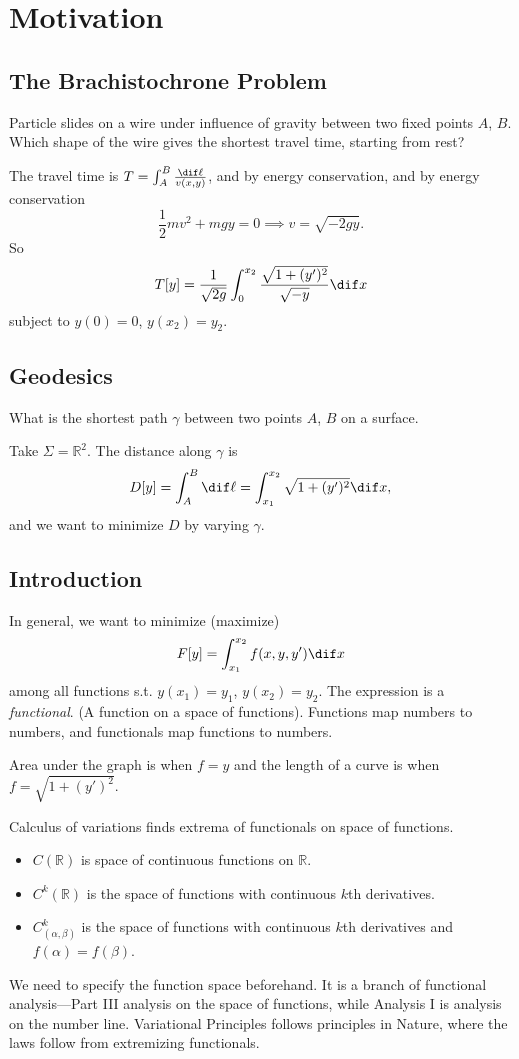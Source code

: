 \section*{Motivation}
\subsection{The Brachistochrone Problem}
\begin{problem}
Particle slides on a wire under influence of gravity between two fixed points \(A\), \(B\). Which shape of the wire gives the shortest travel time, starting from rest?
\end{problem}

The travel time is \(T = \int_{A}^{B} \frac{\dif \ell}{v(x, y)}\), and by energy conservation, and by energy conservation
\[
    \frac{1}{2} mv^2 + mg y = 0 \implies v = \sqrt{-2gy}.
\]
So
\[
    T[y] = \frac{1}{\sqrt{2g}}\int_{0}^{x_2} \frac{\sqrt{1 + (y')^2}}{\sqrt{-y}} \dif x
\]
subject to \(y(0) = 0\), \(y(x_2) = y_2\).
\subsection{Geodesics}
\begin{problem}
    What is the shortest path \(\gamma\) between two points \(A\), \(B\) on a surface.
\end{problem}
Take \(\Sigma = \mathbb{R}^2\). The distance along \(\gamma\) is
\[
    D[y] = \int_{A}^{B}\dif \ell = \int_{x_1}^{x_2} \sqrt{1 + (y')^2} \dif x,
\]
and we want to minimize \(D\) by varying \(\gamma\).
\subsection{Introduction}
In general, we want to minimize (maximize)
\[
    F[y] = \int_{x_1}^{x_2} f(x, y, y') \dif x
\]
among all functions s.t. \(y(x_1) = y_1\), \(y(x_2) = y_2\). The expression is a \textit{functional}. (A function on a space of functions). Functions map numbers to numbers, and functionals map functions to numbers.

Area under the graph is when \(f = y\) and the length of a curve is when \(f = \sqrt{1 + (y')^2}\).

Calculus of variations finds extrema of functionals on space of functions.
\begin{notation}
    \begin{itemize}
        \item \(C(\mathbb{R})\) is space of continuous functions on \(\mathbb{R}\).
        \item \(C^k(\mathbb{R})\) is the space of functions with continuous \(k\)th derivatives.
        \item \(C^k_{(\alpha,\beta)}\) is the space of functions with continuous \(k\)th derivatives and \(f(\alpha) = f(\beta)\).
    \end{itemize}
    We need to specify the function space beforehand. It is a branch of functional analysis---Part III analysis on the space of functions, while Analysis I is analysis on the number line. Variational Principles follows principles in Nature, where the laws follow from extremizing functionals.
\end{notation}


